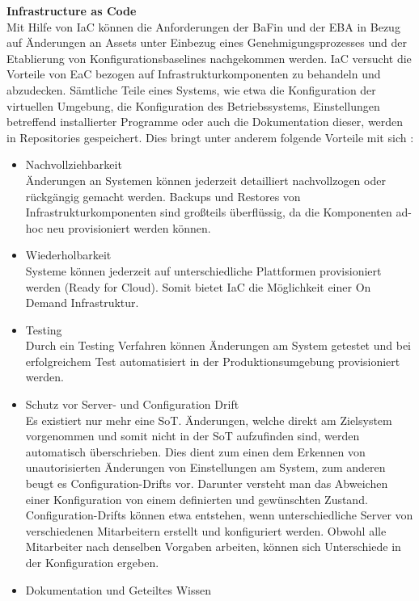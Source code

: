 \bigbreak
\textbf{Infrastructure as Code}\\
Mit Hilfe von IaC können die Anforderungen der BaFin und der EBA in Bezug auf Änderungen an Assets unter Einbezug eines Genehmigungsprozesses und der Etablierung von Konfigurationsbaselines nachgekommen werden. 
IaC versucht die Vorteile von EaC bezogen auf Infrastrukturkomponenten zu behandeln und abzudecken. Sämtliche Teile eines Systems, wie etwa die Konfiguration der virtuellen Umgebung, die Konfiguration des Betriebssystems, Einstellungen betreffend installierter Programme oder auch die Dokumentation dieser, werden in Repositories gespeichert.
Dies bringt unter anderem folgende Vorteile mit sich \autocite{hackernoon_2020}:
\begin{itemize}
    \item Nachvollziehbarkeit\\
        Änderungen an Systemen können jederzeit detailliert nachvollzogen oder rückgängig gemacht werden. Backups und Restores von Infrastrukturkomponenten sind großteils überflüssig, da die Komponenten ad-hoc neu provisioniert werden können.
    \item Wiederholbarkeit\\
        Systeme können jederzeit auf unterschiedliche Plattformen provisioniert werden (Ready for Cloud). Somit bietet IaC die Möglichkeit einer \glqq{}On Demand Infrastruktur\grqq{}.
    \item Testing\\
        Durch ein Testing Verfahren können Änderungen am System getestet und bei erfolgreichem Test automatisiert in der Produktionsumgebung provisioniert werden.
    \item Schutz vor Server- und Configuration Drift\\
        Es existiert nur mehr eine SoT. Änderungen, welche direkt am Zielsystem vorgenommen und somit nicht in der SoT aufzufinden sind, werden automatisch überschrieben. Dies dient zum einen dem Erkennen von unautorisierten Änderungen von Einstellungen am System, zum anderen beugt es Configuration-Drifts vor. Darunter versteht man das Abweichen einer Konfiguration von einem definierten und gewünschten Zustand. Configuration-Drifts können etwa entstehen, wenn unterschiedliche Server von verschiedenen Mitarbeitern erstellt und konfiguriert werden. Obwohl alle Mitarbeiter nach denselben Vorgaben arbeiten, können sich Unterschiede in der Konfiguration ergeben. \autocite{morris}
    \item Dokumentation und Geteiltes Wissen\\

\end{itemize}
